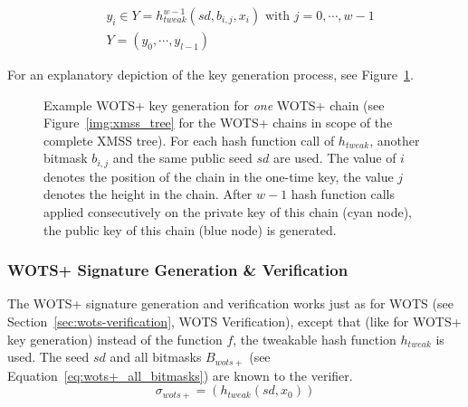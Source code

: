 \begin{align}
\label{eq:wots+_pubkeygen}
&y_i \in Y = h_{tweak}^{w-1}(sd,b_{i,j}, x_i) \text{ with } j= 0,\cdots,w-1 \\
&Y = (y_0, \cdots, y_{l-1})
\end{align}

For an explanatory depiction of the key generation process, see Figure~\ref{img:wots+_bitmask_hashcall}.


\begin{figure}
\centering
{}
\caption{Example WOTS+ key generation for \textit{one} WOTS+ chain (see Figure~\ref{img:xmss_tree} for the WOTS+ chains in scope of the complete XMSS tree). For each hash function call of $h_{tweak}$, another bitmask $b_{i,j}$ and the same public seed $sd$ are used. The value of $i$ denotes the position of the chain in the one-time key, the value $j$ denotes the height in the chain.
After $w-1$ hash function calls applied consecutively on the private key of this chain (\textcolor{cyan_tud}{cyan node}), the public key of this chain (\textcolor{darkblue_tud}{blue node}) is generated.  }
\label{img:wots+_bitmask_hashcall}
\end{figure}


\subsubsection{WOTS+ Signature Generation \& Verification}
The WOTS+ signature generation and verification works just as for WOTS (see Section~\ref{sec:wots-verification}, WOTS Verification), except that (like for WOTS+ key generation) instead of the function $f$, the tweakable hash function $h_{tweak}$ is used. The seed $sd$ and all bitmasks $B_{wots+}$ (see Equation~\ref{eq:wots+_all_bitmasks}) are known to the verifier.
\begin{equation}
\label{eq:wots+_sig_gen}
\sigma_{wots+} = (h_{tweak}(sd,x_0))
\end{equation}


